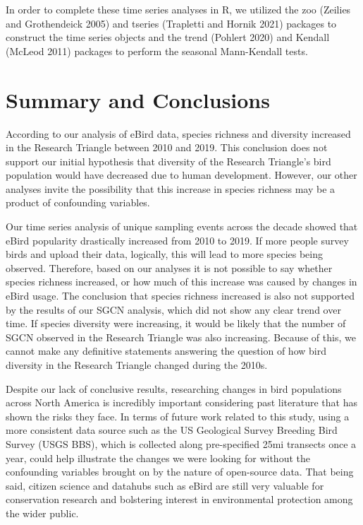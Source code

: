 \documentclass[
  12pt,
]{article}
\begin{document}
In order to complete these time series analyses in R, we utilized the
zoo (Zeilies and Grothendeick 2005) and tseries (Trapletti and Hornik
2021) packages to construct the time series objects and the trend
(Pohlert 2020) and Kendall (McLeod 2011) packages to perform the
seasonal Mann-Kendall tests.

\newpage

\hypertarget{summary-and-conclusions}{%
\section{Summary and Conclusions}\label{summary-and-conclusions}}

According to our analysis of eBird data, species richness and diversity
increased in the Research Triangle between 2010 and 2019. This
conclusion does not support our initial hypothesis that diversity of the
Research Triangle's bird population would have decreased due to human
development. However, our other analyses invite the possibility that
this increase in species richness may be a product of confounding
variables.

Our time series analysis of unique sampling events across the decade
showed that eBird popularity drastically increased from 2010 to 2019. If
more people survey birds and upload their data, logically, this will
lead to more species being observed. Therefore, based on our analyses it
is not possible to say whether species richness increased, or how much
of this increase was caused by changes in eBird usage. The conclusion
that species richness increased is also not supported by the results of
our SGCN analysis, which did not show any clear trend over time. If
species diversity were increasing, it would be likely that the number of
SGCN observed in the Research Triangle was also increasing. Because of
this, we cannot make any definitive statements answering the question of
how bird diversity in the Research Triangle changed during the 2010s.

Despite our lack of conclusive results, researching changes in bird
populations across North America is incredibly important considering
past literature that has shown the risks they face. In terms of future
work related to this study, using a more consistent data source such as
the US Geological Survey Breeding Bird Survey (USGS BBS), which is
collected along pre-specified 25mi transects once a year, could help
illustrate the changes we were looking for without the confounding
variables brought on by the nature of open-source data. That being said,
citizen science and datahubs such as eBird are still very valuable for
conservation research and bolstering interest in environmental
protection among the wider public.
\end{document}
